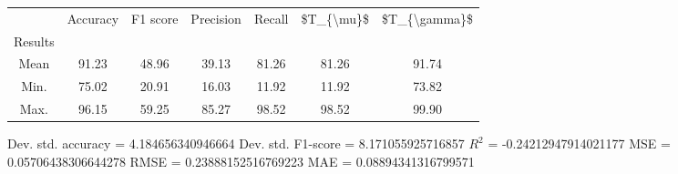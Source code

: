 \begin{tabular}{|c|c|c|c|c|c|c|}
\toprule
{} &  Accuracy &  F1 score &  Precision &  Recall &  \$T\_\{\textbackslash mu\}\$ &  \$T\_\{\textbackslash gamma\}\$ \\
Results &           &           &            &         &            &               \\
\hline
Mean    &     91.23 &     48.96 &      39.13 &   81.26 &      81.26 &         91.74 \\
Min.    &     75.02 &     20.91 &      16.03 &   11.92 &      11.92 &         73.82 \\
Max.    &     96.15 &     59.25 &      85.27 &   98.52 &      98.52 &         99.90 \\
\bottomrule
\end{tabular}

 Dev. std. accuracy = 4.184656340946664
 Dev. std. F1-score = 8.171055925716857
 $R^2$ = -0.24212947914021177
 MSE = 0.05706438306644278
 RMSE = 0.23888152516769223
 MAE = 0.08894341316799571